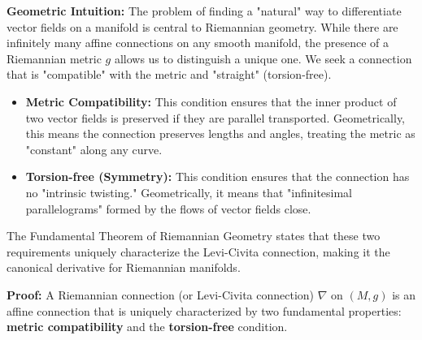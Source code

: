 \begin{solution}
\textbf{Geometric Intuition:} The problem of finding a "natural" way to differentiate vector fields on a manifold is central to Riemannian geometry. While there are infinitely many affine connections on any smooth manifold, the presence of a Riemannian metric $g$ allows us to distinguish a unique one. We seek a connection that is "compatible" with the metric and "straight" (torsion-free).
\begin{itemize}
    \item \textbf{Metric Compatibility:} This condition ensures that the inner product of two vector fields is preserved if they are parallel transported. Geometrically, this means the connection preserves lengths and angles, treating the metric as "constant" along any curve.
    \item \textbf{Torsion-free (Symmetry):} This condition ensures that the connection has no "intrinsic twisting." Geometrically, it means that "infinitesimal parallelograms" formed by the flows of vector fields close.
\end{itemize}
The Fundamental Theorem of Riemannian Geometry states that these two requirements uniquely characterize the Levi-Civita connection, making it the canonical derivative for Riemannian manifolds.

\textbf{Proof:} A Riemannian connection (or Levi-Civita connection) $\nabla$ on $(M, g)$ is an affine connection that is uniquely characterized by two fundamental properties: \textbf{metric compatibility} and the \textbf{torsion-free} condition.


\end{solution}
